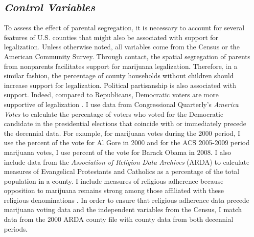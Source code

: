 \subsection{\it{Control Variables}}

To assess the effect of parental segregation, it is necessary to account for several features of U.S. counties that might also be associated with support for legalization. Unless otherwise noted, all variables come from the Census or the American Community Survey. Through contact, the spatial segregation of parents from nonparents facilitates support for marijuana legalization. Therefore, in a similar fashion, the percentage of county households without children should increase support for legalization. Political partisanship is also associated with support. Indeed, compared to Republicans, Democratic voters are more supportive of legalization \citep{rosenthal_and_kubby_1996,caulkins_et_al_2012}. I use data from Congressional Quarterly's {\it{America Votes}} to calculate the percentage of voters who voted for the Democratic candidate in the presidential elections that coincide with or immediately precede the decennial data. For example, for marijuana votes during the 2000 period, I use the percent of the vote for Al Gore in 2000 and for the ACS 2005-2009 period marijuana votes, I use percent of the vote for Barack Obama in 2008. 
I also include data from the {\it{Association of Religion Data Archives}} (ARDA) to calculate measures of Evangelical Protestants and Catholics as a percentage of the total population in a county. I include measures of religious adherence because opposition to marijuana remains strong among those affiliated with these religious denominations \citep{caulkins_et_al_2012,palamar_2014}. In order to ensure that religious adherence data precede marijuana voting data and the independent variables from the Census, I match data from the 2000 ARDA county file with county data from both decennial periods. 

